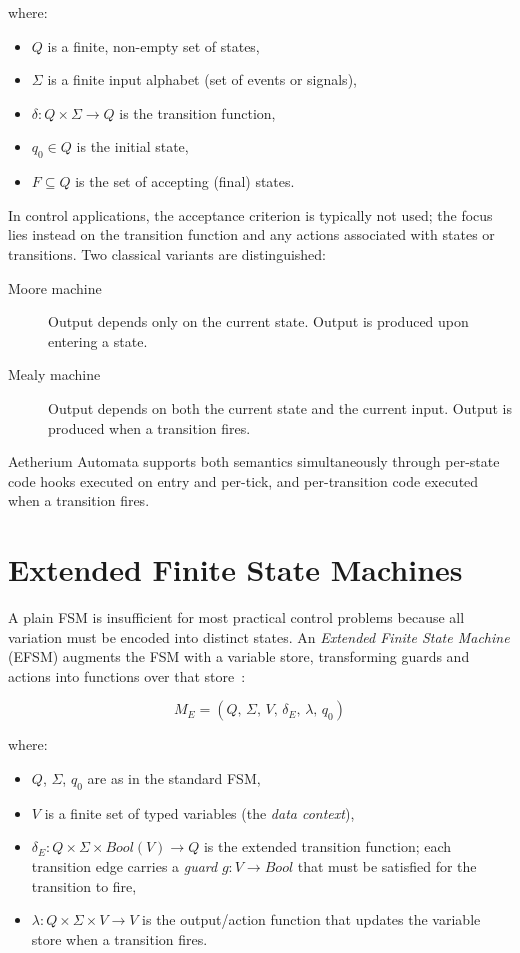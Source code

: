 \noindent where:
\begin{itemize}
  \item $Q$ is a finite, non-empty set of states,
  \item $\Sigma$ is a finite input alphabet (set of events or signals),
  \item $\delta : Q \times \Sigma \rightarrow Q$ is the transition function,
  \item $q_0 \in Q$ is the initial state,
  \item $F \subseteq Q$ is the set of accepting (final) states.
\end{itemize}

In control applications, the acceptance criterion is typically not used; the focus lies instead on the transition function and any actions associated with states or transitions. Two classical variants are distinguished:

\begin{description}
  \item[Moore machine] Output depends only on the current state. Output is produced upon entering a state.
  \item[Mealy machine] Output depends on both the current state and the current input. Output is produced when a transition fires.
\end{description}

Aetherium Automata supports both semantics simultaneously through per-state code hooks executed on entry and per-tick, and per-transition code executed when a transition fires.

\section{Extended Finite State Machines}
\label{sec:efsm}

A plain FSM is insufficient for most practical control problems because all variation must be encoded into distinct states. An \textit{Extended Finite State Machine} (EFSM) augments the FSM with a variable store, transforming guards and actions into functions over that store~\cite{Harel1987}:

\begin{equation}
  M_E = (Q,\, \Sigma,\, V,\, \delta_E,\, \lambda,\, q_0)
\end{equation}

\noindent where:
\begin{itemize}
  \item $Q$, $\Sigma$, $q_0$ are as in the standard FSM,
  \item $V$ is a finite set of typed variables (the \textit{data context}),
  \item $\delta_E : Q \times \Sigma \times \mathit{Bool}(V) \rightarrow Q$ is the extended transition function; each transition edge carries a \textit{guard} $g : V \rightarrow \mathit{Bool}$ that must be satisfied for the transition to fire,
  \item $\lambda : Q \times \Sigma \times V \rightarrow V$ is the output/action function that updates the variable store when a transition fires.
\end{itemize}

